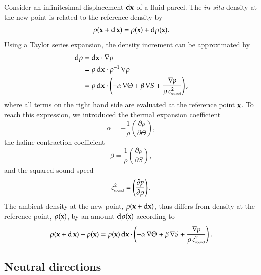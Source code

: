 Consider an infinitesimal displacement $\mathrm{d}{\bf x}$ of a fluid
parcel.  The {\it in situ} density at the new point is related to the
reference density by
\begin{equation}
 \rho({\bf x} + \mathrm{d} \, {\bf x})= \rho({\bf x}) + \mathrm{d}\rho({\bf x}).
\end{equation}
Using a Taylor series expansion, the density increment can be
approximated by
\begin{equation}
\begin{split}
\mathrm{d}\rho &=  \mathrm{d}{\bf x} \cdot \nabla \rho
 \\
 &= \rho \, \mathrm{d}{\bf x} \cdot \rho^{-1} \, \nabla \rho
\\
&= 
\rho \, \mathrm{d}{\bf x} \cdot 
 \left( -\alpha \, \nabla \Theta + \beta \, \nabla  S  + \frac{\nabla p}{\rho \, c_{\mbox{\tiny sound}}^{2}  } \right),
\end{split}
\label{eq:full-density-increment-displacement}
\end{equation}
where all terms on the right hand side are evaluated at the reference
point ${\bf x}$.  To reach this expression, we introduced the thermal
expansion coefficient
\begin{equation}
 \alpha = -\frac{1}{\rho}\left( \frac{\partial \rho}{\partial \Theta} \right),
\label{eq:alpha-elements}
\end{equation}
the haline contraction coefficient 
\begin{equation}
 \beta = \frac{1}{\rho}\left( \frac{\partial \rho}{\partial S} \right),
\label{eq:beta-elements}
\end{equation}
and the squared sound speed
\begin{equation}
 c^{2}_{\mbox{\tiny sound}} = \left( \frac{\partial p}{\partial \rho}\right).
\label{eq:sound-speed-elements}
\end{equation}
The ambient density at the new point, $\rho({\bf x} + \mathrm{d} {\bf
  x})$, thus differs from density at the reference point, $\rho({\bf
  x})$, by an amount $\mathrm{d}\rho({\bf x})$ according to
\begin{equation}
 \rho({\bf x} + \mathrm{d} \, {\bf x}) - \rho({\bf x}) = 
 \rho({\bf x}) \, \mathrm{d}{\bf x} \cdot 
 \left( -\alpha \, \nabla \Theta + \beta \, \nabla  S  + \frac{ \nabla p }{\rho \, c_{\mbox{\tiny sound}}^{2}  }\right).
\end{equation}


\subsection{Neutral directions}
\label{subsection:neutral-directions}

